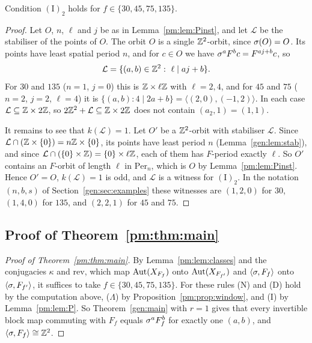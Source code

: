 \begin{lemma}\label{pm:lem:P}
Condition $(\mathrm I)_2$ holds for $f\in\{30,45,75,135\}$.
\end{lemma}

\begin{proof}
Let $O$, $n$, $\ell$ and $j$ be as in Lemma~\ref{pm:lem:Pinst}, and let $\mathcal L$ be the stabiliser of the points of $O$. The orbit $O$ is a single $\mathbb{Z}^2$-orbit, since $\sigma(O)=O$. Its points have least spatial period $n$, and for $c\in O$ we have $\sigma^aF^bc=F^{aj+b}c$, so
\[
\mathcal L=\{(a,b)\in\mathbb{Z}^2:\ \ell\mid aj+b\}.
\]
For $30$ and $135$ ($n=1$, $j=0$) this is $\mathbb{Z}\times\ell\mathbb{Z}$ with $\ell=2,4$, and for $45$ and $75$ ($n=2$, $j=2$, $\ell=4$) it is $\{(a,b):4\mid 2a+b\}=\langle(2,0),(-1,2)\rangle$. In each case $\mathcal L\subseteq\mathbb{Z}\times2\mathbb{Z}$, so $2\mathbb{Z}^2+\mathcal L\subseteq\mathbb{Z}\times2\mathbb{Z}$ does not contain $(a_2,1)=(1,1)$.

It remains to see that $k(\mathcal L)=1$. Let $O'$ be a $\mathbb{Z}^2$-orbit with stabiliser $\mathcal L$. Since $\mathcal L\cap(\mathbb{Z}\times\{0\})=n\mathbb{Z}\times\{0\}$, its points have least period $n$ (Lemma~\ref{gen:lem:stab}), and since $\mathcal L\cap(\{0\}\times\mathbb{Z})=\{0\}\times\ell\mathbb{Z}$, each of them has $F$-period exactly $\ell$. So $O'$ contains an $F$-orbit of length $\ell$ in $\mathrm{Per}_n$, which is $O$ by Lemma~\ref{pm:lem:Pinst}. Hence $O'=O$, $k(\mathcal L)=1$ is odd, and $\mathcal L$ is a witness for $(\mathrm I)_2$. In the notation $(n,b,s)$ of Section~\ref{gen:sec:examples} these witnesses are $(1,2,0)$ for $30$, $(1,4,0)$ for $135$, and $(2,2,1)$ for $45$ and $75$.
\end{proof}

\subsection{Proof of Theorem~\ref{pm:thm:main}}\label{pm:sec:proofs}

\begin{proof}[Proof of Theorem~\ref{pm:thm:main}]
By Lemma~\ref{pm:lem:classes} and the conjugacies $\kappa$ and $\mathrm{rev}$, which map $\operatorname{Aut}(X_{F_f})$ onto $\operatorname{Aut}(X_{F_{f'}})$ and $\langle\sigma,F_f\rangle$ onto $\langle\sigma,F_{f'}\rangle$, it suffices to take $f\in\{30,45,75,135\}$. For these rules \textup{(N)} and \textup{(D)} hold by the computation above, \textup{($\Lambda$)} by Proposition~\ref{pm:prop:window}, and \textup{(I)} by Lemma~\ref{pm:lem:P}. So Theorem~\ref{gen:main} with $r=1$ gives that every invertible block map commuting with $F_f$ equals $\sigma^aF_f^b$ for exactly one $(a,b)$, and $\langle\sigma,F_f\rangle\cong\mathbb{Z}^2$.
\end{proof}

